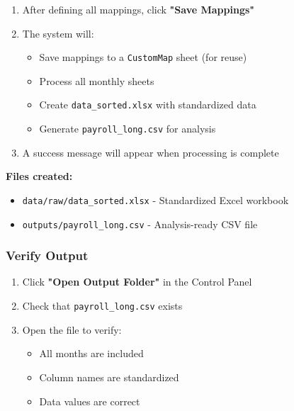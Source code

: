\documentclass[11pt,a4paper]{article}
\begin{document}
\begin{enumerate}[leftmargin=*]
    \item After defining all mappings, click \textbf{"Save Mappings"}
    \item The system will:
    \begin{itemize}
        \item Save mappings to a \texttt{CustomMap} sheet (for reuse)
        \item Process all monthly sheets
        \item Create \texttt{data\_sorted.xlsx} with standardized data
        \item Generate \texttt{payroll\_long.csv} for analysis
    \end{itemize}
    \item A success message will appear when processing is complete
\end{enumerate}

\begin{successbox}[title=Processing Complete]
\textbf{Files created:}
\begin{itemize}
    \item \texttt{data/raw/data\_sorted.xlsx} - Standardized Excel workbook
    \item \texttt{outputs/payroll\_long.csv} - Analysis-ready CSV file
\end{itemize}
\end{successbox}

\subsubsection{Verify Output}

\begin{enumerate}[leftmargin=*]
    \item Click \textbf{"Open Output Folder"} in the Control Panel
    \item Check that \texttt{payroll\_long.csv} exists
    \item Open the file to verify:
    \begin{itemize}
        \item All months are included
        \item Column names are standardized
        \item Data values are correct
    \end{itemize}
\end{enumerate}

\newpage
\end{document}
